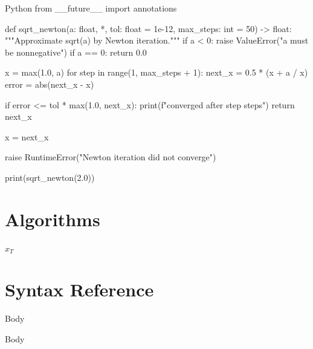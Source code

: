 \documentclass{report}
\begin{document}
\begin{codeblock}[title={Newton's method for square roots}]{Python}
	from __future__ import annotations


	def sqrt_newton(a: float, *, tol: float = 1e-12, max_steps: int = 50) -> float:
	"""Approximate sqrt(a) by Newton iteration."""
	if a < 0:
	raise ValueError("a must be nonnegative")
	if a == 0:
	return 0.0

	x = max(1.0, a)
	for step in range(1, max_steps + 1):
	next_x = 0.5 * (x + a / x)
	error = abs(next_x - x)

	if error <= tol * max(1.0, next_x):
	print(f"converged after {step} steps")
	return next_x

	x = next_x

	raise RuntimeError("Newton iteration did not converge")


	print(sqrt_newton(2.0))
\end{codeblock}

\section{Algorithms}
\begin{algorithm}[H]
	\caption{Projected gradient descent}
	\Return $x_T$\;
\end{algorithm}

\newpage
\section{Syntax Reference}

\begin{latexcodeblock}[title={Short Commands}]


	\sol Body
	\begin{sol}
		Body
	\end{sol}
\end{latexcodeblock}
\end{document}
